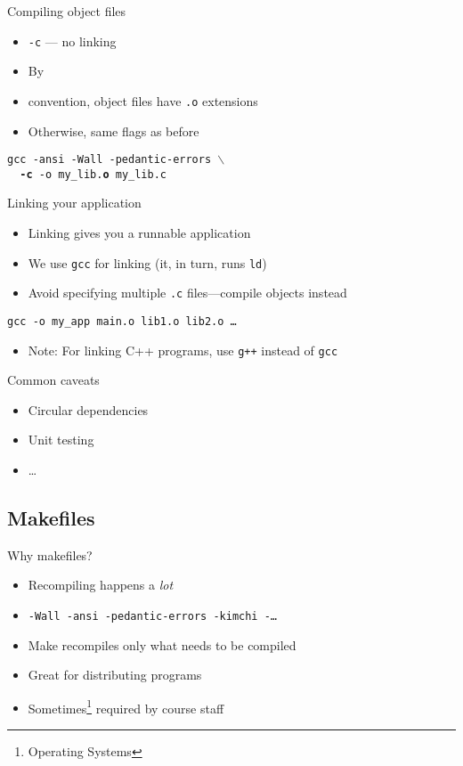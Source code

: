 \documentclass{beamer}
\begin{document}
\begin{frame}{Compiling object files}
  \begin{itemize}
    \item \texttt{-c} --- no linking
    \item By \item{convention}, object files have \texttt{.o} extensions
    \item Otherwise, same flags as before
  \end{itemize}

  \texttt{gcc -ansi -Wall -pedantic-errors $\backslash$ \\
  ~~\textbf{-c} -o my\_lib.\textbf{o} my\_lib.c}
\end{frame}

\begin{frame}{Linking your application}
  \begin{itemize}
    \item Linking gives you a runnable application
    \item We use \texttt{gcc} for linking (it, in turn, runs \texttt{ld})
    \item Avoid specifying multiple \texttt{.c} files---compile objects instead
  \end{itemize}

  \texttt{gcc -o my\_app main.o lib1.o lib2.o \ldots}

  \begin{itemize}
    \item Note: For linking C++ programs, use \texttt{g++} instead of
      \texttt{gcc}
  \end{itemize}
\end{frame}

\begin{frame}{Common caveats}
  \begin{itemize}
    \item Circular dependencies
    \item Unit testing
    \item \ldots
  \end{itemize}
\end{frame}

\subsection{Makefiles}

\begin{frame}{Why makefiles?}
  \begin{itemize}
    \item Recompiling happens a \emph{lot}
    \item \texttt{-Wall -ansi -pedantic-errors -kimchi -\ldots}
    \item Make recompiles only what needs to be compiled
    \item Great for distributing programs
      \pause
    \item Sometimes\footnote{Operating Systems} required by course staff
  \end{itemize}
\end{frame}
\end{document}
